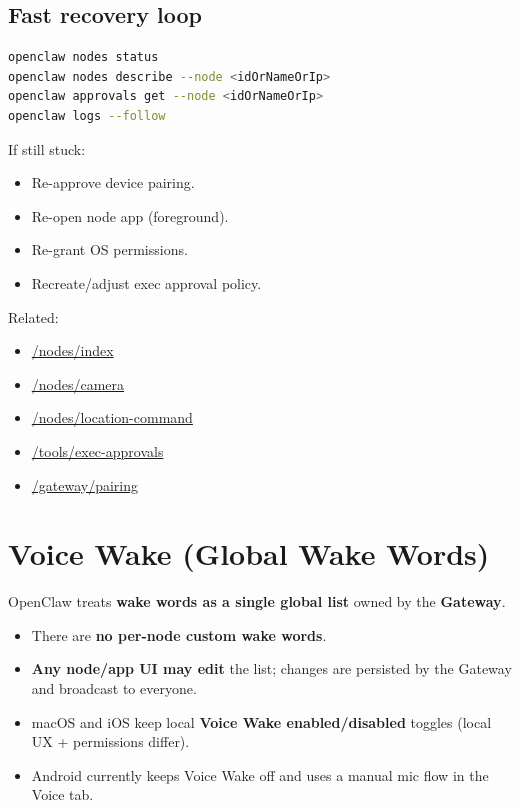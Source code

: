 \subsection{Fast recovery loop}


\begin{lstlisting}[language=bash]
openclaw nodes status
openclaw nodes describe --node <idOrNameOrIp>
openclaw approvals get --node <idOrNameOrIp>
openclaw logs --follow
\end{lstlisting}


If still stuck:

\begin{itemize}
  \item Re-approve device pairing.
  \item Re-open node app (foreground).
  \item Re-grant OS permissions.
  \item Recreate/adjust exec approval policy.
\end{itemize}


Related:

\begin{itemize}
  \item \href{/nodes/index}{/nodes/index}
  \item \href{/nodes/camera}{/nodes/camera}
  \item \href{/nodes/location-command}{/nodes/location-command}
  \item \href{/tools/exec-approvals}{/tools/exec-approvals}
  \item \href{/gateway/pairing}{/gateway/pairing}
\end{itemize}



\clearpage

\section{Voice Wake (Global Wake Words)}


OpenClaw treats \textbf{wake words as a single global list} owned by the \textbf{Gateway}.

\begin{itemize}
  \item There are \textbf{no per-node custom wake words}.
  \item \textbf{Any node/app UI may edit} the list; changes are persisted by the Gateway and broadcast to everyone.
  \item macOS and iOS keep local \textbf{Voice Wake enabled/disabled} toggles (local UX + permissions differ).
  \item Android currently keeps Voice Wake off and uses a manual mic flow in the Voice tab.
\end{itemize}


